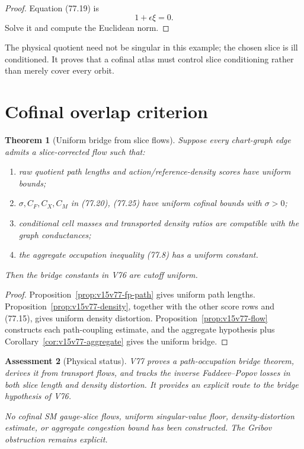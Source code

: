 \documentclass[11pt]{article}
\newtheorem{theorem}{Theorem}[section]
\newtheorem{assessment}[theorem]{Assessment}
\theoremstyle{remark}
\begin{document}
\begin{proof}
Equation (77.19) is
\[
 1+\epsilon\xi=0.
\]
Solve it and compute the Euclidean norm.
\end{proof}

The physical quotient need not be singular in this example; the
chosen slice is ill conditioned.  It proves that a cofinal atlas
must control slice conditioning rather than merely cover every
orbit.

\section{Cofinal overlap criterion}

\begin{theorem}[Uniform bridge from slice flows]
\label{thm:v15v77-uniform}
Suppose every chart-graph edge admits a slice-corrected flow such
that:
\begin{enumerate}
\item raw quotient path lengths and action/reference-density scores
      have uniform bounds;
\item \(\sigma,C_F,C_X,C_M\) in (77.20), (77.25) have uniform
      cofinal bounds with \(\sigma>0\);
\item conditional cell masses and transported density ratios are
      compatible with the graph conductances;
\item the aggregate occupation inequality (77.8) has a uniform
      constant.
\end{enumerate}
Then the bridge constants in V76 are cutoff uniform.
\end{theorem}

\begin{proof}
Proposition~\ref{prop:v15v77-fp-path} gives uniform path lengths.
Proposition~\ref{prop:v15v77-density}, together with the other
score rows and (77.15), gives uniform density distortion.
Proposition~\ref{prop:v15v77-flow} constructs each path-coupling
estimate, and the aggregate hypothesis plus
Corollary~\ref{cor:v15v77-aggregate} gives the uniform bridge.
\end{proof}

\begin{assessment}[Physical status]
\label{ass:v15v77-status}
V77 proves a path-occupation bridge theorem, derives it from
transport flows, and tracks the inverse Faddeev--Popov losses in
both slice length and density distortion.  It provides an explicit
route to the bridge hypothesis of V76.

No cofinal SM gauge-slice flows, uniform singular-value floor,
density-distortion estimate, or aggregate congestion bound has
been constructed.  The Gribov obstruction remains explicit.
\end{assessment}
\end{document}
